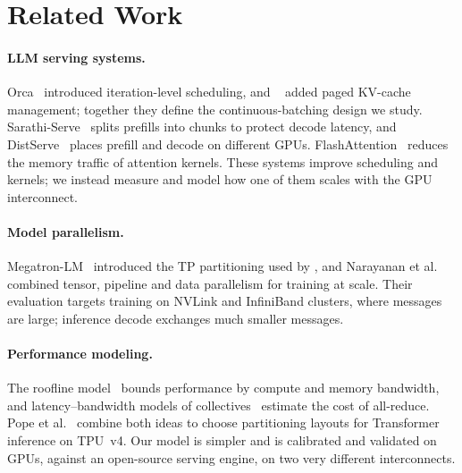 \section{Related Work}
\label{sec:related}

\paragraph{LLM serving systems.}
Orca~\cite{yu2022orca} introduced iteration-level scheduling, and
\vllm~\cite{kwon2023pagedattention} added paged KV-cache management; together they define
the continuous-batching design we study.
Sarathi-Serve~\cite{agrawal2024sarathi} splits prefills into chunks to protect decode
latency, and DistServe~\cite{zhong2024distserve} places prefill and decode on different
GPUs.
FlashAttention~\cite{dao2022flashattention,dao2024flashattention2} reduces the memory
traffic of attention kernels.
These systems improve scheduling and kernels; we instead measure and model how one of
them scales with the GPU interconnect.

\paragraph{Model parallelism.}
Megatron-LM~\cite{shoeybi2019megatron} introduced the TP partitioning used by \vllm, and
Narayanan et al.~\cite{narayanan2021efficient} combined tensor, pipeline and data
parallelism for training at scale.
Their evaluation targets training on NVLink and InfiniBand clusters, where messages are
large; inference decode exchanges much smaller messages.

\paragraph{Performance modeling.}
The roofline model~\cite{williams2009roofline} bounds performance by compute and memory
bandwidth, and latency--bandwidth models of collectives~\cite{hockney1994communication,
thakur2005optimization} estimate the cost of all-reduce.
Pope et al.~\cite{pope2023efficiently} combine both ideas to choose partitioning layouts
for Transformer inference on TPU~v4.
Our model is simpler and is calibrated and validated on GPUs, against an open-source
serving engine, on two very different interconnects.
